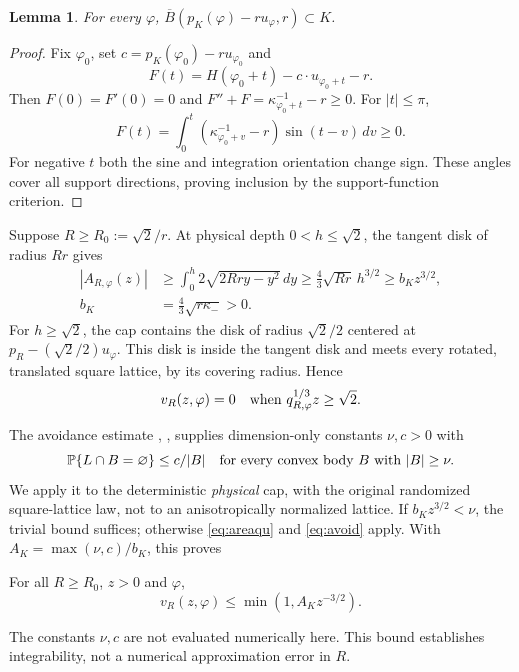 \documentclass[11pt,a4paper]{article}
\newtheorem{lemma}{Lemma}\newtheorem{corollary}{Corollary}
\theoremstyle{remark}\newtheorem{remark}{Remark}
\numberwithin{equation}{section}
\begin{document}
\begin{lemma}\label{lem:rolling}
For every $\varphi$, $\overline B(p_K(\varphi)-ru_\varphi,r)\subset K$.
\end{lemma}
\begin{proof}
Fix $\varphi_0$, set $c=p_K(\varphi_0)-ru_{\varphi_0}$ and
\[
 F(t)=H(\varphi_0+t)-c\cdot u_{\varphi_0+t}-r.
\]
Then $F(0)=F'(0)=0$ and $F''+F=\kappa_{\varphi_0+t}^{-1}-r\ge0$. For $|t|\le\pi$,
\[
 F(t)=\int_0^t(\kappa_{\varphi_0+v}^{-1}-r)\sin(t-v)\,dv\ge0.
\]
For negative $t$ both the sine and integration orientation change sign. These angles cover all support directions, proving inclusion by the support-function criterion.
\end{proof}

Suppose $R\ge R_0:=\sqrt2/r$. At physical depth $0<h\le\sqrt2$, the tangent disk of radius $Rr$ gives
\begin{align}
 |A_{R,\varphi}(z)|
 &\ge\int_0^h2\sqrt{2Rry-y^2}\,dy
 \ge\frac43\sqrt{Rr}\,h^{3/2}
 \ge b_Kz^{3/2},\label{eq:areaqu}\\
 b_K&=\frac43\sqrt{r\kappa_-}>0.\nonumber
\end{align}
For $h\ge\sqrt2$, the cap contains the disk of radius $\sqrt2/2$ centered at $p_R-(\sqrt2/2)u_\varphi$. This disk is inside the tangent disk and meets every rotated, translated square lattice, by its covering radius. Hence
\begin{equation}\label{eq:cutoff}
 v_R(z,\varphi)=0\quad\hbox{when }q_{R,\varphi}^{1/3}z\ge\sqrt2.
\end{equation}

The avoidance estimate \cite[Lemma~3.2]{NR}, \cite[Theorem~1.1]{B}, supplies dimension-only constants $\nu,c>0$ with
\begin{equation}\label{eq:avoid}
 \mathbb P\{L\cap B=\varnothing\}\le c/|B|\quad\hbox{for every convex body }B\hbox{ with }|B|\ge\nu.
\end{equation}
We apply it to the deterministic \emph{physical} cap, with the original randomized square-lattice law, not to an anisotropically normalized lattice. If $b_Kz^{3/2}<\nu$, the trivial bound suffices; otherwise \eqref{eq:areaqu} and \eqref{eq:avoid} apply. With $A_K=\max(\nu,c)/b_K$, this proves
\begin{proposition}\label{prop:qu}
For all $R\ge R_0$, $z>0$ and $\varphi$,
\begin{equation}\label{eq:qu}
 v_R(z,\varphi)\le\min(1,A_Kz^{-3/2}).
\end{equation}
\end{proposition}
The constants $\nu,c$ are not evaluated numerically here. This bound establishes integrability, not a numerical approximation error in $R$.
\end{document}
